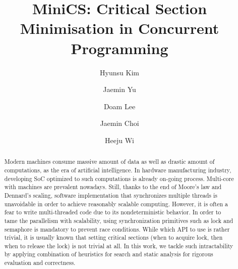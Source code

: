 \documentclass[sigconf]{acmart}
\begin{document}
\title{MiniCS: Critical Section Minimisation in Concurrent Programming}
\author{Hyunsu Kim}

\author{Jaemin Yu}

\author{Doam Lee}

\author{Jaemin Choi}

\author{Heeju Wi}

\begin{abstract}
Modern machines consume massive amount of data as well as drastic amount of computations, as the era of artificial intelligence. In hardware manufacturing industry, developing SoC optimized to such computations is already on-going process. Multi-core with machines are prevalent nowadays. Still, thanks to the end of Moore's law and Dennard's scaling, software implementation that synchronizes multiple threads is unavoidable in order to achieve reasonably scalable computing. However, it is often a fear to write multi-threaded code due to its nondeterministic behavior. In order to tame the parallelism with scalability, using synchronization primitives such as lock and semaphore is mandatory to prevent race conditions. While which API to use is rather trivial, it is usually known that setting critical sections (when to acquire lock, then when to release the lock) is not trivial at all. In this work, we tackle such intractability by applying combination of heuristics for search and static analysis for rigorous evaluation and correctness.
\end{abstract}

\maketitle
\end{document}
